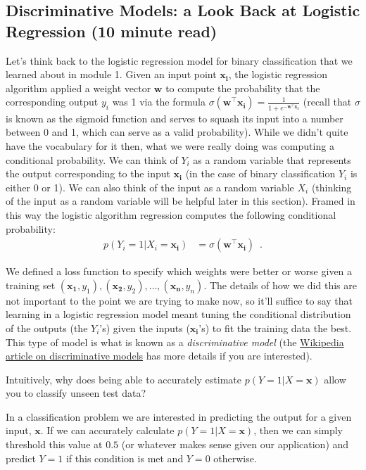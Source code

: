 \documentclass[assignment02_Solutions]{subfiles}
\begin{document}
\subsection{Discriminative Models: a Look Back at Logistic Regression (10 minute read)}

Let's think back to the logistic regression model for binary classification that we learned about in module 1.  Given an input point $\mathbf{x_i}$, the logistic regression algorithm applied a weight vector $\mathbf{w}$ to compute the probability that the corresponding output $y_i$ was 1 via the formula $\sigma(\mathbf{w}^\top \mathbf{x_i}) = \frac{1}{1+e^{-\mathbf{w}^\top \mathbf{x_i}}}$ (recall that $\sigma$ is known as the sigmoid function and serves to squash its input into a number between 0 and 1, which can serve as a valid probability).  While we didn't quite have the vocabulary for it then, what we were really doing was computing a conditional probability.  We can think of $Y_i$ as a random variable that represents the output corresponding to the input $\mathbf{x_i}$ (in the case of binary classification $Y_i$ is either 0 or 1).  We can also think of the input as a random variable $X_i$ (thinking of the input as a random variable will be helpful later in this section).  Framed in this way the logistic algorithm regression computes the following conditional probability:
\begin{align}
p(Y_i = 1 | X_i = \mathbf{x_i}) &= \sigma(\mathbf{w}^\top \mathbf{x_i}) \enspace .
\end{align}

We defined a loss function to specify which weights were better or worse given a training set $(\mathbf{x_1}, y_1), (\mathbf{x_2}, y_2), \ldots, (\mathbf{x_n}, y_n)$.  The details of how we did this are not important to the point we are trying to make now, so it'll suffice to say that learning in a logistic regression model meant tuning the conditional distribution of the outputs (the $Y_i$'s) given the inputs ($\mathbf{x_i}$'s) to fit the training data the best.  This type of model is what is known as a \emph{discriminative model} (the \href{https://en.wikipedia.org/wiki/Discriminative_model}{Wikipedia article on discriminative models} has more details if you are interested).

\vspace{1em}

\begin{understandingcheck}
Intuitively, why does being able to accurately estimate $p(Y = 1 | X = \mathbf{x})$ allow you to classify unseen test data?

\begin{boxedsolution}
In a classification problem we are interested in predicting the output for a given input, $\mathbf{x}$.  If we can accurately calculate $p(Y=1|X = \mathbf{x})$, then we can simply threshold this value at $0.5$ (or whatever makes sense given our application) and predict $Y = 1$ if this condition is met and $Y = 0$ otherwise.
\end{boxedsolution}
\end{understandingcheck}
\end{document}
